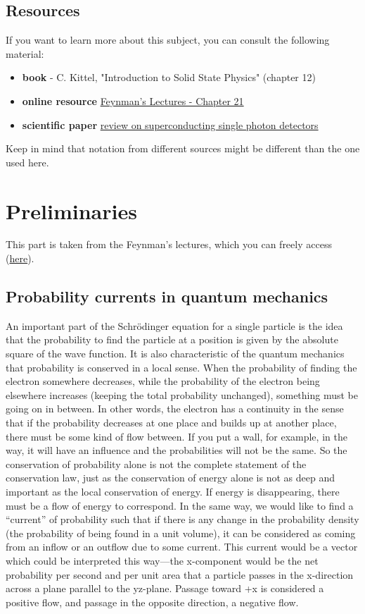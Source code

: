 \documentclass[a4paper,11pt]{article}
\renewcommand{\b}{\bf\sffamily}
\begin{document}
\subsection* {Resources}
If you want to learn more about this subject, you can consult the following material:
\begin{itemize}
\item {\b book} - C. Kittel, "Introduction to Solid State Physics" (chapter 12)
\item {\b online resource} \href{https://en.wikipedia.org/wiki/Fresnel_equations}{Feynman's Lectures - Chapter 21}
\item {\b scientific paper} \href{https://iopscience.iop.org/article/10.1088/0953-2048/25/6/063001/pdf}{review on superconducting single photon detectors}
\end{itemize}
Keep in mind that notation from different sources might be different than the one used here.

\section {Preliminaries}
This part is taken from the Feynman's lectures, which you can freely access  (\href{https://www.feynmanlectures.caltech.edu/III_21.html#Ch21-SUM}{here}).
\subsection{Probability currents in quantum mechanics}
An important part of the Schrödinger equation for a single particle is the idea that the probability to find the particle at a position is given by the absolute square of the wave function. It is also characteristic of the quantum mechanics that probability is conserved in a local sense. When the probability of finding the electron somewhere decreases, while the probability of the electron being elsewhere increases (keeping the total probability unchanged), something must be going on in between. In other words, the electron has a continuity in the sense that if the probability decreases at one place and builds up at another place, there must be some kind of flow between. If you put a wall, for example, in the way, it will have an influence and the probabilities will not be the same. So the conservation of probability alone is not the complete statement of the conservation law, just as the conservation of energy alone is not as deep and important as the local conservation of energy. If energy is disappearing, there must be a flow of energy to correspond. In the same way, we would like to find a “current” of probability such that if there is any change in the probability density (the probability of being found in a unit volume), it can be considered as coming from an inflow or an outflow due to some current. This current would be a vector which could be interpreted this way—the x-component would be the net probability per second and per unit area that a particle passes in the x-direction across a plane parallel to the yz-plane. Passage toward +x is considered a positive flow, and passage in the opposite direction, a negative flow.
\end{document}
